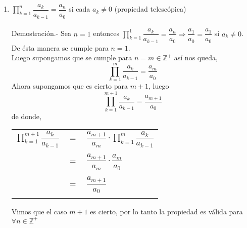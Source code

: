\begin{enumerate}[ \bfseries 1.]
\item $\displaystyle\prod_{k=1}^n \dfrac{a_k}{a_{k-1}} = \dfrac{a_n}{a_0}$ si cada $a_k\neq 0$ (propiedad telescópica)\\\\
Demostración.- \; Sea $n=1$ entonces $\prod\limits_{k=1}^1 \dfrac{a_k}{a_{k-1}} = \dfrac{a_n}{a_0} \Rightarrow \dfrac{a_1}{a_0} = \dfrac{a_1}{a_0}$ si $a_k \neq 0$. De ésta manera se cumple para $n=1$.\\
Luego supongamos que se cumple para $n = m \in \mathbb{Z}^+ $ así nos queda, $$\prod\limits_{k=1}^m \dfrac{a_k}{a_{k-1}} = \dfrac{a_m}{a_0}$$
Ahora supongamos que es cierto para $m+1$, luego $$\prod\limits_{k=1}^{m+1} \dfrac{a_k}{a_{k-1}} = \dfrac{a_{m+1}}{a_0}$$ de donde,\\
\begin{center}
\begin{tabular}{rcl}
$\prod\limits_{k=1}^{m+1} \dfrac{a_k}{a_{k-1}}$&$=$&$\dfrac{a_{m+1}}{a_m} \cdot \prod\limits_{k=1}^{m} \dfrac{a_k}{a_{k-1}}$\\\\
&$=$&$\dfrac{a_{m+1}}{a_m} \cdot \dfrac{a_m}{a_0}$\\\\
&$=$&$\dfrac{a_{m+1}}{a_0}$\\\\
\end{tabular}
\end{center}
Vimos que el caso $m+1$ es cierto, por lo tanto la propiedad es válida para $\forall n \in \mathbb{Z}^+$\\\\


\end{enumerate}
